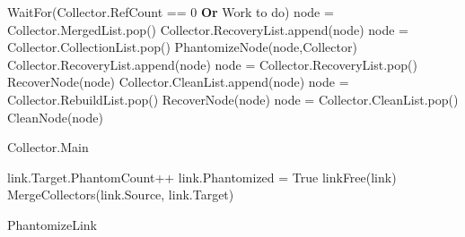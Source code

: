 \setlength{\textfloatsep}{0pt}
\begin{algorithm}[H]
	\scriptsize
	
		\begin{algorithmic}[1]
{}
\State WaitFor(Collector.RefCount == 0 {\bf Or} Work to do)
\EndIf
{}
\State node = Collector.MergedList.pop()
\State Collector.RecoveryList.append(node)
\EndWhile
{}
\State node = Collector.CollectionList.pop()
\State PhantomizeNode(node,Collector)
\State Collector.RecoveryList.append(node)
\EndWhile
{}
\State node = Collector.RecoveryList.pop()
\State RecoverNode(node)
\State Collector.CleanList.append(node)
\EndWhile
{}
\State node = Collector.RebuildList.pop()
\State RecoverNode(node)
\EndWhile
{}
\State node = Collector.CleanList.pop()
\State CleanNode(node)
\EndWhile
\EndWhile
\EndProcedure
\caption{Collector.Main}
\label{algorithm:main}
\end{algorithmic}
\end{algorithm}
\setlength{\textfloatsep}{0pt}


\begin{algorithm}[H]
	\scriptsize
	
		\begin{algorithmic}[1]
{}
\EndIf
{}
\EndIf
\State link.Target.PhantomCount++
\State link.Phantomized = True
\State linkFree(link)
\State MergeCollectors(link.Source, link.Target)
\EndProcedure
\caption{PhantomizeLink}
\label{single:algorithm:phantomizelink}
\end{algorithmic}
\end{algorithm}



